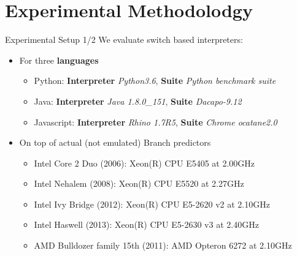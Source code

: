 \documentclass[10pt]{beamer}
\begin{document}
\section{Experimental Methodolodgy}
\begin{frame}{Experimental Setup 1/2}
	We evaluate switch based interpreters:
	\begin{itemize}
		\item {For three \textbf{languages}}
			\begin{itemize}
				\item {Python: \textbf{Interpreter} \textit{Python3.6}, \textbf{Suite} \textit{Python benchmark suite\footnotemark[2]}} 
				\item {Java: \textbf{Interpreter} \textit{Java 1.8.0\_151}, \textbf{Suite} \textit{Dacapo-9.12}} 
				\item {Javascript: \textbf{Interpreter} \textit{Rhino 1.7R5}, \textbf{Suite} \textit{Chrome ocatane2.0}}
			\end{itemize}
		\item {On top of actual (not emulated) Branch predictors}
		\begin{itemize}
			\item {Intel Core 2 Duo (2006): Xeon(R) CPU E5405 at 2.00GHz} 
			\item {Intel Nehalem (2008): Xeon(R) CPU E5520 at 2.27GHz} 
			\item {Intel Ivy Bridge (2012): Xeon(R) CPU E5-2620 v2 at 2.10GHz} 
			\item {Intel Haswell (2013): Xeon(R) CPU E5-2630 v3 at 2.40GHz} 
			\item {AMD Bulldozer family 15th (2011): AMD Opteron 6272 at 2.10GHz}
		\end{itemize}
		
	\end{itemize}
\end{frame}
\end{document}
